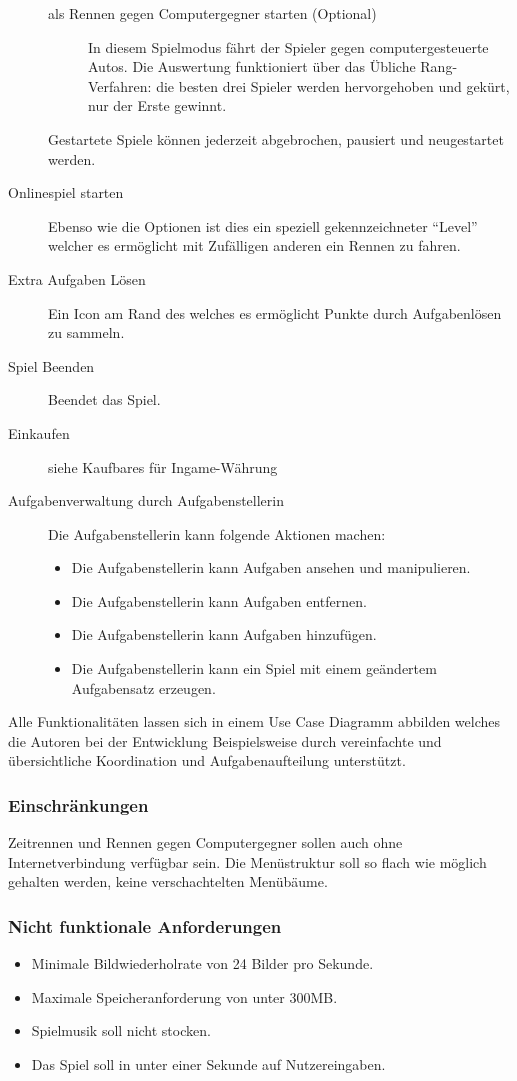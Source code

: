 \begin{description}
{\begin{description}
				\item[als Rennen gegen Computergegner starten (Optional)]{ In diesem Spielmodus fährt der Spieler gegen computergesteuerte Autos. Die Auswertung funktioniert über das Übliche Rang-Verfahren: die besten drei Spieler werden hervorgehoben und gekürt, nur der Erste gewinnt.}
			\end{description}
			Gestartete Spiele können jederzeit abgebrochen, pausiert und neugestartet werden.
		}
		\item[Onlinespiel starten]{ Ebenso wie die Optionen ist dies ein speziell gekennzeichneter \enquote{Level} welcher es ermöglicht mit Zufälligen anderen ein Rennen zu fahren. }
		\item[Extra Aufgaben Lösen]{ Ein Icon am Rand des welches es ermöglicht Punkte durch Aufgabenlösen zu sammeln. }
		\item[Spiel Beenden]{ Beendet das Spiel. }
		\item[Einkaufen]{ siehe Kaufbares für Ingame-Währung }
		\item[Aufgabenverwaltung durch Aufgabenstellerin]{
			Die Aufgabenstellerin kann folgende Aktionen machen:
			\begin{itemize}
				\item{ Die Aufgabenstellerin kann Aufgaben ansehen und manipulieren. }
				\item{ Die Aufgabenstellerin kann Aufgaben entfernen. }
				\item{ Die Aufgabenstellerin kann Aufgaben hinzufügen. }
				\item{ Die Aufgabenstellerin kann ein Spiel mit einem geändertem Aufgabensatz erzeugen.	}
			\end{itemize}
		}
	\end{description}
	Alle Funktionalitäten lassen sich in einem Use Case Diagramm abbilden welches die Autoren bei der Entwicklung Beispielsweise durch vereinfachte und übersichtliche Koordination und Aufgabenaufteilung unterstützt.
	\label{ssec:ucd}

	\subsubsection{Einschränkungen}
		Zeitrennen und Rennen gegen Computergegner sollen auch ohne Internetverbindung verfügbar sein.
		Die Menüstruktur soll so flach wie möglich gehalten werden, keine verschachtelten Menübäume.
	\subsubsection{Nicht funktionale Anforderungen}
		\begin{itemize}
			\item{ Minimale Bildwiederholrate von 24 Bilder pro Sekunde. }
			\item{ Maximale Speicheranforderung von unter 300MB. }
			\item{ Spielmusik soll nicht stocken. }
			\item{ Das Spiel soll in unter einer Sekunde auf Nutzereingaben. }
		\end{itemize}

